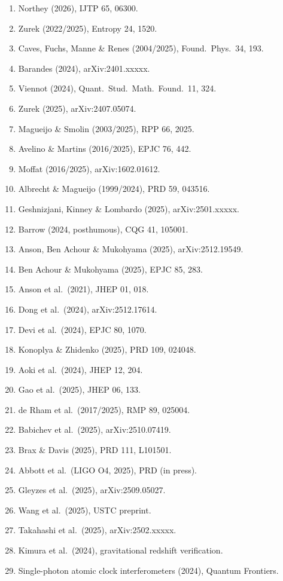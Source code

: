 \documentclass[11pt,a4paper]{article}
\begin{document}
\begin{enumerate}
\item Northey (2026), IJTP 65, 06300.
\item Zurek (2022/2025), Entropy 24, 1520.
\item Caves, Fuchs, Manne \& Renes (2004/2025), Found.\ Phys.\ 34, 193.
\item Barandes (2024), arXiv:2401.xxxxx.
\item Viennot (2024), Quant.\ Stud.\ Math.\ Found.\ 11, 324.
\item Zurek (2025), arXiv:2407.05074.
\item Magueijo \& Smolin (2003/2025), RPP 66, 2025.
\item Avelino \& Martins (2016/2025), EPJC 76, 442.
\item Moffat (2016/2025), arXiv:1602.01612.
\item Albrecht \& Magueijo (1999/2024), PRD 59, 043516.
\item Geshnizjani, Kinney \& Lombardo (2025), arXiv:2501.xxxxx.
\item Barrow (2024, posthumous), CQG 41, 105001.
\item Anson, Ben Achour \& Mukohyama (2025), arXiv:2512.19549.
\item Ben Achour \& Mukohyama (2025), EPJC 85, 283.
\item Anson et al.\ (2021), JHEP 01, 018.
\item Dong et al.\ (2024), arXiv:2512.17614.
\item Devi et al.\ (2024), EPJC 80, 1070.
\item Konoplya \& Zhidenko (2025), PRD 109, 024048.
\item Aoki et al.\ (2024), JHEP 12, 204.
\item Gao et al.\ (2025), JHEP 06, 133.
\item de Rham et al.\ (2017/2025), RMP 89, 025004.
\item Babichev et al.\ (2025), arXiv:2510.07419.
\item Brax \& Davis (2025), PRD 111, L101501.
\item Abbott et al.\ (LIGO O4, 2025), PRD (in press).
\item Gleyzes et al.\ (2025), arXiv:2509.05027.
\item Wang et al.\ (2025), USTC preprint.
\item Takahashi et al.\ (2025), arXiv:2502.xxxxx.
\item Kimura et al.\ (2024), gravitational redshift verification.
\item Single-photon atomic clock interferometers (2024), Quantum Frontiers.

\end{enumerate}
\end{document}
